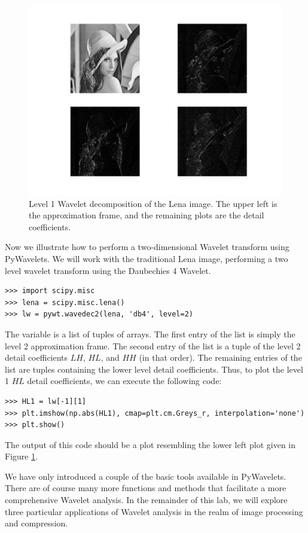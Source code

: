 \begin{figure}[t]
    \includegraphics[width=\linewidth]{dwt2.pdf}
    \caption{Level 1 Wavelet decomposition of the Lena image.
    The upper left is the approximation frame, and the remaining
    plots are the detail coefficients.}
    \label{fig:dwt2}
\end{figure}

Now we illustrate how to perform a two-dimensional Wavelet transform using
PyWavelets. We will work with the traditional Lena image, performing a
two level wavelet transform using the Daubechies 4 Wavelet.
\begin{lstlisting}
>>> import scipy.misc
>>> lena = scipy.misc.lena()
>>> lw = pywt.wavedec2(lena, 'db4', level=2)
\end{lstlisting}
The variable  is a list of tuples of arrays. The first entry of the list is
simply the level 2 approximation frame. The second entry of the list is a tuple of
the level 2 detail coefficients $LH$, $HL$, and $HH$ (in that order). The remaining
entries of the list are tuples containing the lower level detail coefficients.
Thus, to plot the level 1 $HL$ detail coefficients, we can execute the following code:
\begin{lstlisting}
>>> HL1 = lw[-1][1]
>>> plt.imshow(np.abs(HL1), cmap=plt.cm.Greys_r, interpolation='none')
>>> plt.show()
\end{lstlisting}
The output of this code should be a plot resembling the lower left plot given in Figure
\ref{fig:dwt2}.

We have only introduced a couple of the basic tools available in PyWavelets. There
are of course many more functions and methods that facilitate a more comprehensive
Wavelet analysis. In the remainder of this lab, we will explore three particular 
applications of Wavelet analysis in the realm of image processing and compression.

